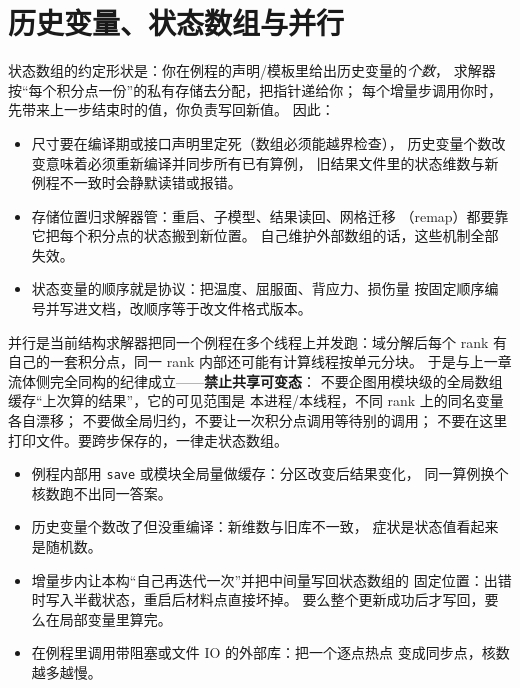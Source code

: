 \documentclass[12pt,a4paper,fontset=fandol]{ctexbook}
\newcommand{\Tp}[1]{\texttt{#1}}
\begin{document}
\section{历史变量、状态数组与并行}
\label{sec:ch04-statev}

状态数组的约定形状是：你在例程的声明/模板里给出历史变量的\emph{个数}，
求解器按``每个积分点一份''的私有存储去分配，把指针递给你；
每个增量步调用你时，先带来上一步结束时的值，你负责写回新值。
因此：

\begin{itemize}
  \item 尺寸要在编译期或接口声明里定死（数组必须能越界检查），
        历史变量个数改变意味着必须重新编译并同步所有已有算例，
        旧结果文件里的状态维数与新例程不一致时会静默读错或报错。
  \item 存储位置归求解器管：重启、子模型、结果读回、网格迁移
        （remap）都要靠它把每个积分点的状态搬到新位置。
        自己维护外部数组的话，这些机制全部失效。
  \item 状态变量的顺序就是协议：把温度、屈服面、背应力、损伤量
        按固定顺序编号并写进文档，改顺序等于改文件格式版本。
\end{itemize}

并行是当前结构求解器把同一个例程在多个线程上并发跑：域分解后每个
rank 有自己的一套积分点，同一 rank 内部还可能有计算线程按单元分块。
于是与上一章流体侧完全同构的纪律成立——\textbf{禁止共享可变态}：
不要企图用模块级的全局数组缓存``上次算的结果''，它的可见范围是
本进程/本线程，不同 rank 上的同名变量各自漂移；
不要做全局归约，不要让一次积分点调用等待别的调用；
不要在这里打印文件。要跨步保存的，一律走状态数组。

\begin{warning}[title={状态与并行的四类典型事故}]
\begin{itemize}
  \item 例程内部用 \Tp{save} 或模块全局量做缓存：分区改变后结果变化，
        同一算例换个核数跑不出同一答案。
  \item 历史变量个数改了但没重编译：新维数与旧库不一致，
        症状是状态值看起来是随机数。
  \item 增量步内让本构``自己再迭代一次''并把中间量写回状态数组的
        固定位置：出错时写入半截状态，重启后材料点直接坏掉。
        要么整个更新成功后才写回，要么在局部变量里算完。
  \item 在例程里调用带阻塞或文件 IO 的外部库：把一个逐点热点
        变成同步点，核数越多越慢。
\end{itemize}
\end{warning}
\end{document}
